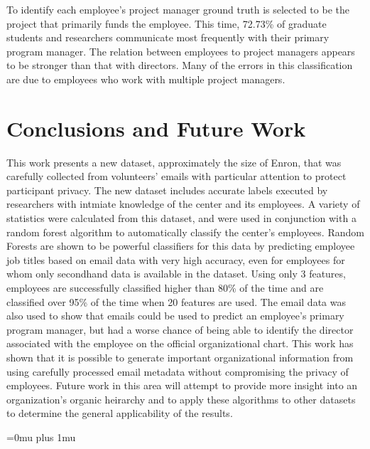 \documentclass{article}
\begin{document}
To identify each employee's project manager ground truth is selected to be the project that primarily funds the employee.  This time, 72.73\% of graduate students and researchers communicate most frequently with their primary program manager.  The relation between employees to project managers appears to be stronger than that with directors.  Many of the errors in this classification are due to employees who work with multiple project managers.  

\section{Conclusions and Future Work} \label{Conclusions}
This work presents a new dataset, approximately the size of Enron, that was carefully collected from volunteers' emails with particular attention to protect participant privacy.  The new dataset includes accurate labels executed by researchers with intmiate knowledge of the center and its employees.  A variety of statistics were calculated from this dataset, and were used in conjunction with a random forest algorithm to automatically classify the center's employees.  Random Forests are shown to be powerful classifiers for this data by predicting employee job titles based on email data with very high accuracy, even for employees for whom only secondhand data is available in the dataset.  Using only 3 features, employees are successfully classified higher than 80\% of the time and are classified over 95\% of the time when 20 features are used.  The email data was also used to show that emails could be used to predict an employee's primary program manager, but had a worse chance of being able to identify the director associated with the employee on the official organizational chart.  This work has shown that it is possible to generate important organizational information from using carefully processed email metadata without compromising the privacy of employees.  Future work in this area will attempt to provide more insight into an organization's organic heirarchy and to apply these algorithms to other datasets to determine the general applicability of the results.

\clearpage
\Urlmuskip=0mu plus 1mu\relax


\end{document}
